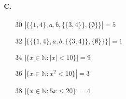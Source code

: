 \documentclass{article}
\begin{document}
\paragraph{C.}
\begin{enumerate}
    \item [30] $|\{\{1,4\},a,b,\{\{3,4\}\},\{\emptyset\}\}| = 5$
    \item [32] $|\{\{\{1,4\},a,b,\{\{3,4\}\},\{\emptyset\}\}\}| = 1$
    \item [34] $|\{ x \in \mathbb{N}: |x|<10 \}| = 9$
    \item [36] $|\{ x \in \mathbb{N}: x^2<10 \}| = 3$
    \item [38] $|\{ x \in \mathbb{N}: 5x \le 20 \}| = 4$

\end{enumerate}
\end{document}
